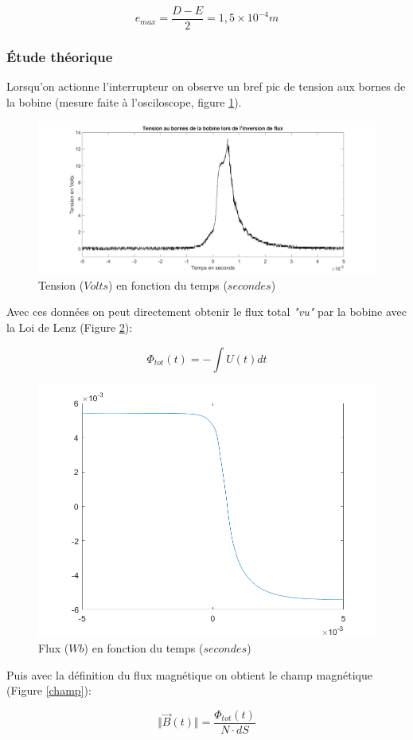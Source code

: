 \documentclass{rapportENS}
\begin{document}
 \begin{equation}
     e_{max} = \frac{D-E}{2} = 1,5\times 10^{-4} m
 \end{equation}
 
 \subsubsection{Étude théorique}
 
 Lorsqu'on actionne l'interrupteur on observe un bref pic de tension aux bornes de la bobine (mesure faite à l'osciloscope, figure \ref{tensionobine}).
 
 \begin{figure}[h!]
 \includegraphics[width = .5\linewidth]{tension.png}
 \centering
 \caption{Tension ($Volts$) en fonction du temps ($secondes$)}
 \label{tensionobine}
 \end{figure}
 
 Avec ces données on peut directement obtenir le flux total \textit{"vu"} par la bobine avec la Loi de Lenz (Figure \ref{fluxobine}):
 
 \begin{equation}
 \Phi_{tot}(t) = -\int U(t) dt
 \end{equation}
 
 \begin{figure}[h!]
 \includegraphics[width = .5\linewidth]{flux.png}
 \centering
 \caption{Flux ($Wb$) en fonction du temps ($secondes$)}
 \label{fluxobine}
 \end{figure}
 
 Puis avec la définition du flux magnétique on obtient le champ magnétique (Figure \ref{champ}): 
 
 \begin{equation}
 \Vert \overrightarrow{B}(t) \Vert = \frac{\Phi_{tot}(t)}{N \cdot dS}
 \end{equation}
 
\end{document}

